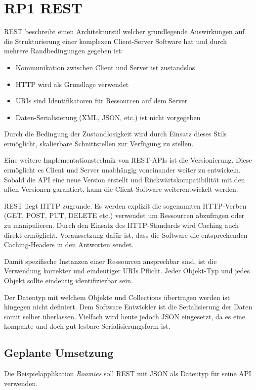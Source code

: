 \section{RP1 REST}
\label{sec:principle-rp1-rest}

\gls{REST} beschreibt einen Architekturstil welcher grundlegende Auswirkungen auf die Strukturierung einer komplexen Client-Server Software hat und durch mehrere Randbedingungen gegeben ist:
\begin{itemize}
	\item Kommunikation zwischen Client und Server ist zustandslos
	\item HTTP wird als Grundlage verwendet
	\item \glspl{URI} sind Identifikatoren für Ressourcen auf dem Server
	\item Daten-Serialisierung (XML, JSON, etc.) ist nicht vorgegeben
\end{itemize}

Durch die Bedingung der Zustandlosigkeit wird durch Einsatz dieses Stils ermöglicht, skalierbare Schnittstellen zur Verfügung zu stellen.

Eine weitere Implementationstechnik von REST-APIs ist die Versionierung. Diese ermöglicht es Client und Server unabhängig voneinander weiter zu entwickeln.
Sobald die API eine neue Version erstellt und Rückwärtskompatibilität mit den alten Versionen garantiert, kann die Client-Software weiterentwickelt werden.

REST liegt HTTP zugrunde. Es werden explizit die sogenannten HTTP-Verben (GET, POST, PUT, DELETE etc.) verwendet um Ressourcen abzufragen oder zu manipulieren.
Durch den Einsatz des HTTP-Standards wird Caching auch direkt ermöglicht. Voraussetzung dafür ist, dass die Software die entsprechenden Caching-Headers in den Antworten sendet.

Damit spezifische Instanzen einer Ressourcen ansprechbar sind, ist die Verwendung korrekter und eindeutiger \glspl{URI} Pflicht. Jeder Objekt-Typ und jedes Objekt sollte eindeutig identifizierbar sein.

Der Datentyp mit welchem Objekte und Collections übertragen werden ist hingegen nicht definiert. Dem Software Entwickler ist die Serialisierung der Daten somit selber überlassen.
Vielfach wird heute jedoch \gls{JSON} eingesetzt, da es eine kompakte und doch gut lesbare Serialisierungsform ist.


\subsection*{Geplante Umsetzung}
Die Beispielapplikation \emph{Roomies} soll REST mit JSON als Datentyp für seine API verwenden.

